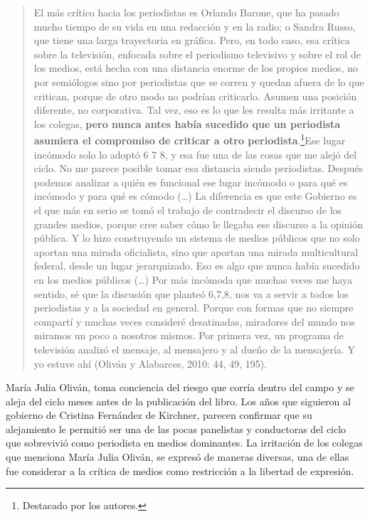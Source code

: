 {\begin{quote}
El más crítico hacia los periodistas es Orlando Barone, que ha pasado mucho tiempo de su vida en una redacción y en la radio; o Sandra Russo, que tiene una larga trayectoria en gráfica. Pero, en todo caso, esa crítica sobre la televisión, enfocada sobre el periodismo televisivo y sobre el rol de los medios, está hecha con una distancia enorme de los propios medios, no por semiólogos sino por periodistas que se corren y quedan afuera de lo que critican, porque de otro modo no podrían criticarlo. Asumen una posición diferente, no corporativa. Tal vez, eso es lo que les resulta más irritante a los colegas, \textbf{pero nunca antes había sucedido que un periodista asumiera el compromiso de criticar a otro periodista}.\footnote{Destacado por los autores.}Ese lugar incómodo solo lo adoptó 6 7 8, y esa fue una de las cosas que me alejó del ciclo. No me parece posible tomar esa distancia siendo periodistas. Después podemos analizar a quién es funcional ese lugar incómodo o para qué es incómodo y para qué es cómodo (\ldots) La diferencia es que este Gobierno es el que más en serio se tomó el trabajo de contradecir el discurso de los grandes medios, porque cree saber cómo le llegaba ese discurso a la opinión pública. Y lo hizo construyendo un sistema de medios públicos que no solo aportan una mirada oficialista, sino que aportan una mirada multicultural federal, desde un lugar jerarquizado. Eso es algo que nunca había sucedido en los medios públicos (\ldots) Por más incómoda que muchas veces me haya sentido, sé que la discusión que planteó 6,7,8, nos va a servir a todos los periodistas y a la sociedad en general. Porque con formas que no siempre compartí y muchas veces consideré desatinadas, miradores del mundo nos miramos un poco a nosotros mismos. Por primera vez, un programa de televisión analizó el mensaje, al mensajero y al dueño de la mensajería. Y yo estuve ahí (Oliván y Alabarces, 2010: 44, 49, 195).
\end{quote}

María Julia Oliván, toma conciencia del riesgo que corría dentro del campo y se aleja del ciclo meses antes de la publicación del libro. Los años que siguieron al gobierno de Cristina Fernández de Kirchner, parecen confirmar que su alejamiento le permitió ser una de las pocas panelistas y conductoras del ciclo que sobrevivió como periodista en medios dominantes. La irritación de los colegas que menciona María Julia Oliván, se expresó de maneras diversas, una de ellas fue considerar a la crítica de medios como restricción a la libertad de expresión.

}
